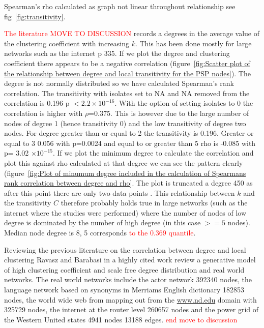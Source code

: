 Spearman's rho calculated as graph not linear throughout relationship see fig~\ref{fig:transitivity}.

\textcolor{red}{The literature MOVE TO DISCUSSION} records a degrees in the average value of the clustering coefficient with increasing $k$. This has been done mostly for large networks such as the internet \cite{newman2018networks} p 335. If we plot the degree and clustering coefficient there appears to be a negative correlation (figure~\ref{fig:Scatter plot of the relationship between degree and local transitivity for the PSP nodes}). The degree is not normally distributed so we have calculated Spearman's rank correlation. The transitivity with isolates set to NA and NA removed from the correlation is 0.196 p $< 2.2 \times 10^{-16}$. With the option of setting isolates to 0 the correlation is higher with $\rho$=0.375. This is however due to the large number of nodes of degree 1 (hence transitivity 0) and the low transitivity of degree two nodes. For degree greater than or equal to 2 the transitivity is 0.196. Greater or equal to 3 0.056 with p=0.0024 and equal to or greater than 5 rho is -0.085 with p= 3.02 $\times 10^{-15}$. If we plot the minimum degree to calculate the correlation and plot
this against rho calculated at that degree we can see the pattern clearly (figure~\ref{fig:Plot of minumum degree included in the calculation of Spearmans rank correlation between degree and rho}. The plot is truncated a degree 450 as after this point there are only two data points .
This relationship between $k$ and the transitivity $C$ therefore probably holds true in large networks (such as the internet where the studies were performed) where the number of nodes of low degree is dominated by the number of high degree (in this case $>=5$ nodes). Median node degree is 8, 5 corresponds \textcolor{red}{ to the 0.369 quantile}.

Reviewing the previous literature on the correlation between degree and local clustering Ravasz and Barabasi in a highly cited work \cite{ravasz2002hierarchical} review a generative model of high clustering coefficient and scale free degree distribution and real world networks. The real world networks include the actor network 392340 nodes, the language network based on synonyms in Merriams English dictionary 182853 nodes, the world wide web from mapping out from the \url{www.nd.edu} domain with 325729 nodes, the internet at the router level 260657 nodes and the power grid of the Western United states 4941 nodes 13188 edges. \textcolor{red}{end move to discussion}

